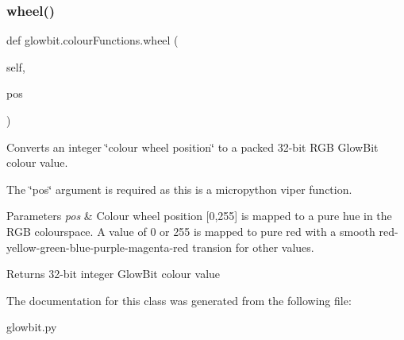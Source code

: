 \subsubsection{\texorpdfstring{wheel()}{wheel()}}
{\footnotesize\ttfamily def glowbit.\+colour\+Functions.\+wheel (\begin{DoxyParamCaption}\item[{}]{self,  }\item[{}]{pos }\end{DoxyParamCaption})}



Converts an integer \char`\"{}colour wheel position\char`\"{} to a packed 32-\/bit R\+GB Glow\+Bit colour value. 

The \char`\"{}pos\char`\"{} argument is required as this is a micropython viper function.


\begin{DoxyParams}{Parameters}
{\em pos} & Colour wheel position \mbox{[}0,255\mbox{]} is mapped to a pure hue in the R\+GB colourspace. A value of 0 or 255 is mapped to pure red with a smooth red-\/yellow-\/green-\/blue-\/purple-\/magenta-\/red transion for other values. \\
\hline
\end{DoxyParams}
\begin{DoxyReturn}{Returns}
32-\/bit integer Glow\+Bit colour value 
\end{DoxyReturn}


The documentation for this class was generated from the following file\+:\begin{DoxyCompactItemize}
\item 
glowbit.\+py\end{DoxyCompactItemize}
